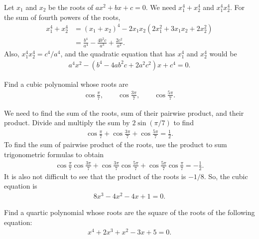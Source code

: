\documentclass[12pt,a4paper]{memoir}
\theoremstyle{definition}
\begin{document}
\begin{solution}
	Let $x_1$ and $x_2$ be the roots of $ax^2+bx+c=0$. We need $x_1^4+x_2^4$ and $x_1^4x_2^4$. For the sum of fourth powers of the roots,
	\begin{align*}
		x_1^4 + x_2^4 &= (x_1+x_2)^4 - 2x_1x_2(2x_1^2+3x_1x_2+2x_2^2)\\
		&= \frac{b^4}{a^4} - \frac{4b^2c}{a^3} + \frac{2c^2}{a^2}.
	\end{align*}
	Also, $x_1^4x_2^4=c^4/a^4$, and the quadratic equation that has $x_1^4$ and $x_2^4$ would be
	\begin{align*}
		a^4x^2 - (b^4-4ab^2c+2a^2c^2)x + c^4 = 0.
	\end{align*}
\end{solution}


\begin{question}
	Find a cubic polynomial whose roots are
	\begin{align*}
		\cos\frac{\pi}{7}, \qquad \cos\frac{3\pi}{7}, \qquad \cos\frac{5\pi}{7}.
	\end{align*}
\end{question}

\begin{solution}
	We need to find the sum of the roots, sum of their pairwise product, and their product. Divide and multiply the sum by $2\sin(\pi/7)$ to find
	\begin{align*}
		\cos\frac{\pi}{7}+ \cos\frac{3\pi}{7}+ \cos\frac{5\pi}{7} = \frac{1}{2}.
	\end{align*}
	To find the sum of pairwise product of the roots, use the product to sum trigonometric formulas to obtain
	\begin{align*}
		\cos\frac{\pi}{7}\cos\frac{3\pi}{7}+ \cos\frac{3\pi}{7}\cos\frac{5\pi}{7}+ \cos\frac{5\pi}{7}\cos\frac{\pi}{7} = -\frac{1}{2}.
	\end{align*}
	It is also not difficult to see that the product of the roots is $-1/8$. So, the cubic equation is
	\begin{align*}
		8x^3 - 4x^2 - 4x + 1 = 0.
	\end{align*}
\end{solution}

\begin{question}
	Find a quartic polynomial whose roots are the square of the roots of the following equation:
	\begin{align*}
		x^4 + 2x^3 + x^2 - 3x + 5 = 0.
	\end{align*}
\end{question}
\end{document}
